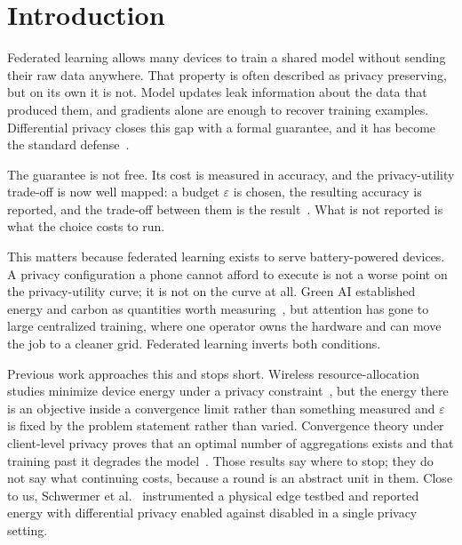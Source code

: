 \section{Introduction}

Federated learning allows many devices to train a shared model without sending
their raw data anywhere. That property is often described as privacy
preserving, but on its own it is not. Model updates leak information about the
data that produced them, and gradients alone are enough to recover training
examples. Differential privacy closes this gap with a formal guarantee, and it
has become the standard defense~\cite{abadi2016deep, geyer2017differentially}.

The guarantee is not free. Its cost is measured in accuracy, and the
privacy-utility trade-off is now well mapped: a budget $\varepsilon$ is chosen, 
the resulting accuracy is reported, and the trade-off between them is 
the result~\cite{abadi2016deep, yousefpour2021opacus}. What is not reported is what the choice costs to run.
 
This matters because federated learning exists to serve battery-powered
devices. A privacy configuration a phone cannot afford to execute is not a
worse point on the privacy-utility curve; it is not on the curve at all.
Green AI established energy and carbon as quantities worth
measuring~\cite{schwartz2020green, strubell2019energy}, but attention has gone to large
centralized training, where one operator owns the hardware and can move the
job to a cleaner grid. Federated learning inverts both conditions.

Previous work approaches this and stops short. Wireless resource-allocation
studies minimize device energy under a privacy constraint~\cite{liu2020privacy, zhang2023communication,
mao2026providing, chen2023energy, ding2026energy}, but the energy there is an objective inside a convergence limit
rather than something measured and $\varepsilon$ is fixed by the problem
statement rather than varied. Convergence theory under client-level privacy
proves that an optimal number of aggregations exists and that training past it
degrades the model~\cite{wei2020federated, wei2021user, zhou2023optimizing}. Those results say where to
stop; they do not say what continuing costs, because a round is an abstract
unit in them. Close to us, Schwermer et al.~\cite{schwermer2023energy} instrumented a
physical edge testbed and reported energy with differential privacy enabled
against disabled in a single privacy setting.
 
